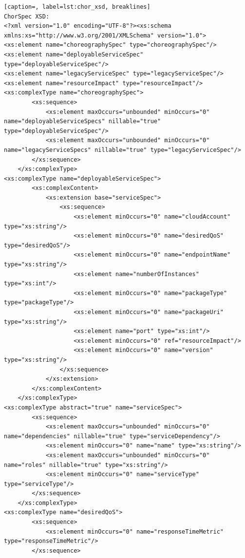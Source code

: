 {\footnotesize

\lstset{language=XML}

\begin{lstlisting}[caption=, label=lst:chor_xsd, breaklines]
ChorSpec XSD:
<?xml version="1.0" encoding="UTF-8"?><xs:schema xmlns:xs="http://www.w3.org/2001/XMLSchema" version="1.0">
<xs:element name="choreographySpec" type="choreographySpec"/>
<xs:element name="deployableServiceSpec" type="deployableServiceSpec"/>
<xs:element name="legacyServiceSpec" type="legacyServiceSpec"/>
<xs:element name="resourceImpact" type="resourceImpact"/>
<xs:complexType name="choreographySpec">
        <xs:sequence>
            <xs:element maxOccurs="unbounded" minOccurs="0" name="deployableServiceSpecs" nillable="true" type="deployableServiceSpec"/>
            <xs:element maxOccurs="unbounded" minOccurs="0" name="legacyServiceSpecs" nillable="true" type="legacyServiceSpec"/>
        </xs:sequence>
    </xs:complexType>
<xs:complexType name="deployableServiceSpec">
        <xs:complexContent>
            <xs:extension base="serviceSpec">
                <xs:sequence>
                    <xs:element minOccurs="0" name="cloudAccount" type="xs:string"/>
                    <xs:element minOccurs="0" name="desiredQoS" type="desiredQoS"/>
                    <xs:element minOccurs="0" name="endpointName" type="xs:string"/>
                    <xs:element name="numberOfInstances" type="xs:int"/>
                    <xs:element minOccurs="0" name="packageType" type="packageType"/>
                    <xs:element minOccurs="0" name="packageUri" type="xs:string"/>
                    <xs:element name="port" type="xs:int"/>
                    <xs:element minOccurs="0" ref="resourceImpact"/>
                    <xs:element minOccurs="0" name="version" type="xs:string"/>
                </xs:sequence>
            </xs:extension>
        </xs:complexContent>
    </xs:complexType>
<xs:complexType abstract="true" name="serviceSpec">
        <xs:sequence>
            <xs:element maxOccurs="unbounded" minOccurs="0" name="dependencies" nillable="true" type="serviceDependency"/>
            <xs:element minOccurs="0" name="name" type="xs:string"/>
            <xs:element maxOccurs="unbounded" minOccurs="0" name="roles" nillable="true" type="xs:string"/>
            <xs:element minOccurs="0" name="serviceType" type="serviceType"/>
        </xs:sequence>
    </xs:complexType>
<xs:complexType name="desiredQoS">
        <xs:sequence>
            <xs:element minOccurs="0" name="responseTimeMetric" type="responseTimeMetric"/>
        </xs:sequence>

\end{lstlisting}}
